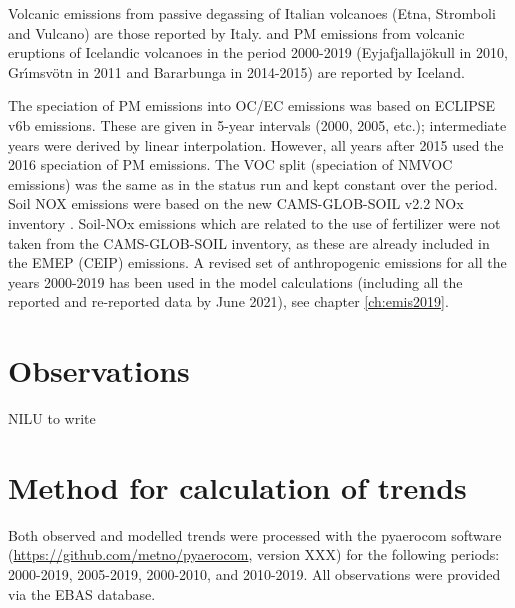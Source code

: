 Volcanic \sox emissions from passive degassing of Italian volcanoes (Etna,
Stromboli and Vulcano) are those reported by
Italy. \sox and PM emissions from volcanic eruptions of Icelandic volcanoes in the period 2000-2019 (Eyjafjallaj\"okull in 2010, Gr{\'{\i}}msv{\"{o}}tn in 2011  and  Bar\dh{}arbunga in 2014-2015) are reported by Iceland. 
 
The speciation of PM emissions into OC/EC emissions was based on ECLIPSE v6b emissions. These are given in 5-year intervals (2000, 2005, etc.); intermediate years were derived by linear interpolation. However, all years after 2015 used the 2016 speciation of PM emissions.
The VOC split (speciation of NMVOC emissions) was the same as in the status run and kept constant over the period.
Soil NOX emissions were based on the new CAMS-GLOB-SOIL v2.2 NOx inventory \citet{SimpsonDarras:2021}. Soil-NOx emissions which are related to the use of fertilizer were not taken from the CAMS-GLOB-SOIL inventory, as these are already included in the EMEP (CEIP) emissions.
A revised set of anthropogenic emissions for all the years 2000-2019 has been used in the model calculations (including all the reported and re-reported data by June 2021), see chapter \ref{ch:emis2019}.

\section{\label{OBSTrends}{Observations}} NILU to write

\section{\label{Method}{Method for calculation of trends}}
Both observed and modelled trends were processed with the pyaerocom software (\url{https://github.com/metno/pyaerocom}, version XXX) for the following periods: 2000-2019, 2005-2019, 2000-2010, and 2010-2019. All observations were provided via the EBAS database. 

